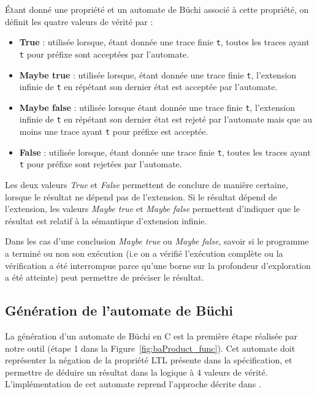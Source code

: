 Étant donné une propriété et un automate de Büchi associé à cette propriété, on
définit les quatre valeurs de vérité par :

\begin{itemize}
\item
  \textbf{True} : utilisée lorsque, étant donnée une trace finie \texttt{t},
  toutes les traces ayant \texttt{t} pour préfixe sont acceptées par
  l'automate.
\item
  \textbf{Maybe true} : utilisée lorsque, étant donnée une trace finie
  \texttt{t}, l'extension infinie de \texttt{t} en répétant son
  dernier état est acceptée par l'automate.
\item
  \textbf{Maybe false} : utilisée lorsque étant donnée une trace finie
  \texttt{t}, l'extension infinie de \texttt{t} en répétant son
  dernier état est rejeté par l'automate mais que au moins une trace
  ayant \texttt{t} pour préfixe est acceptée.
\item
  \textbf{False} : utilisée lorsque, étant donnée une trace finie \texttt{t},
  toutes les traces ayant \texttt{t} pour préfixe sont rejetées par
  l'automate.
\end{itemize}

Les deux valeurs \emph{True} et \emph{False} permettent de conclure de manière
certaine, lorsque le résultat ne dépend pas de l'extension. Si le résultat
dépend de l'extension, les valeurs \emph{Maybe true} et \emph{Maybe false}
permettent d'indiquer que le résultat est relatif à la sémantique d'extension
infinie.

Dans les cas d'une conclusion \emph{Maybe true} ou \emph{Maybe false},
savoir si le programme a terminé ou non son exécution (i.e on a vérifié
l'exécution complète ou la vérification a été interrompue parce qu'une borne sur
la profondeur d'exploration a été atteinte) peut permettre de préciser le résultat.

\subsection{Génération de l'automate de Büchi}

La génération d'un automate de Büchi en C est la première étape réalisée par
notre outil (étape 1 dans la Figure~\ref{fig:baProduct_func}). Cet automate doit
représenter la négation de la propriété \ac{LTL} présente dans la spécification,
et permettre de déduire un résultat dans la logique à 4 valeurs de vérité.
L'implémentation de cet automate reprend l'approche décrite dans
\cite{morse_ltl}.

